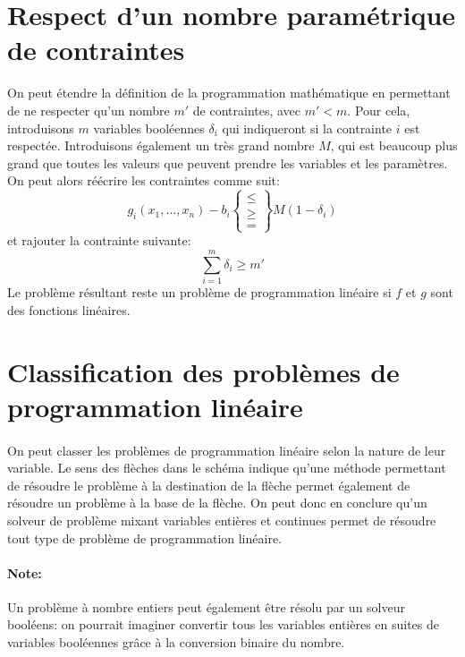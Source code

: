 \documentclass[a4paper]{report}
\begin{document}
\section{Respect d'un nombre paramétrique de contraintes}
On peut étendre la définition de la programmation mathématique en permettant
de ne respecter qu'un nombre \(m'\) de contraintes, avec \(m'<m\).
Pour cela, introduisons \(m\) variables booléennes \(\delta_i\) qui indiqueront
si la contrainte \(i\) est respectée. Introduisons également un très grand nombre \(M\),
qui est beaucoup plus grand que toutes les valeurs que peuvent prendre les variables
et les paramètres. On peut alors réécrire les contraintes comme suit:
\[g_i(x_1,\dots,x_n)-b_i\begin{Bmatrix}\le\\\ge\\=\end{Bmatrix}M(1-\delta_i)\]
et rajouter la contrainte suivante:
\[\sum_{i=1}^{m}\delta_i\ge m'\]
Le problème résultant reste un problème de programmation linéaire si \(f\) et
\(g\) sont des fonctions linéaires.

\section{Classification des problèmes de programmation linéaire}

\paragraph{}On peut classer les problèmes de programmation linéaire selon la nature de leur variable. Le sens des flèches dans le schéma indique qu'une méthode permettant de résoudre le problème à la destination de la flèche permet également de résoudre un problème à la base de la flèche. On peut donc en conclure qu'un solveur de problème mixant variables entières et continues permet de résoudre tout type de problème de programmation linéaire.

\paragraph{Note:}Un problème à nombre entiers peut également être résolu par un solveur booléens: on pourrait imaginer convertir tous les variables entières en suites de variables booléennes grâce à la conversion binaire du nombre.
\end{document}
